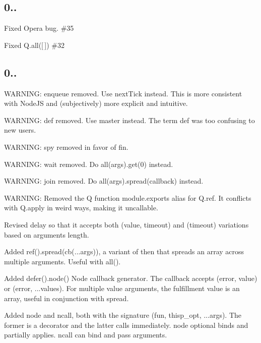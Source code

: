 \subsection*{0..}


\begin{DoxyItemize}
\item Fixed Opera bug. \#35 
\item Fixed {\ttfamily Q.\+all(\mbox{[}$\,$\mbox{]})} \#32 
\end{DoxyItemize}

\subsection*{0..}


\begin{DoxyItemize}
\item W\+A\+R\+N\+I\+NG\+: {\ttfamily enqueue} removed. Use {\ttfamily next\+Tick} instead. This is more consistent with Node\+JS and (subjectively) more explicit and intuitive.
\item W\+A\+R\+N\+I\+NG\+: {\ttfamily def} removed. Use {\ttfamily master} instead. The term {\ttfamily def} was too confusing to new users.
\item W\+A\+R\+N\+I\+NG\+: {\ttfamily spy} removed in favor of {\ttfamily fin}.
\item W\+A\+R\+N\+I\+NG\+: {\ttfamily wait} removed. Do {\ttfamily all(args).get(0)} instead.
\item W\+A\+R\+N\+I\+NG\+: {\ttfamily join} removed. Do {\ttfamily all(args).spread(callback)} instead.
\item W\+A\+R\+N\+I\+NG\+: Removed the {\ttfamily Q} function module.\+exports alias for {\ttfamily Q.\+ref}. It conflicts with {\ttfamily Q.\+apply} in weird ways, making it uncallable.
\item Revised {\ttfamily delay} so that it accepts both {\ttfamily (value, timeout)} and {\ttfamily (timeout)} variations based on arguments length.
\item Added {\ttfamily ref().spread(cb(...args))}, a variant of {\ttfamily then} that spreads an array across multiple arguments. Useful with {\ttfamily all()}.
\item Added {\ttfamily defer().node()} Node callback generator. The callback accepts {\ttfamily (error, value)} or {\ttfamily (error, ...values)}. For multiple value arguments, the fulfillment value is an array, useful in conjunction with {\ttfamily spread}.
\item Added {\ttfamily node} and {\ttfamily ncall}, both with the signature {\ttfamily (fun, thisp\+\_\+opt, ...args)}. The former is a decorator and the latter calls immediately. {\ttfamily node} optional binds and partially applies. {\ttfamily ncall} can bind and pass arguments.
\end{DoxyItemize}


